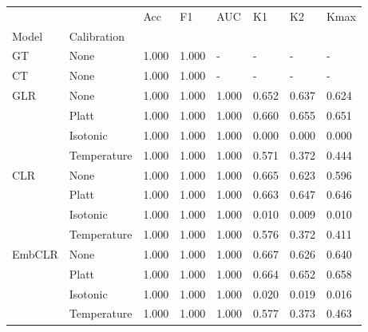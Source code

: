 \begin{tabular}{llllllll}
\toprule
 &  & Acc & F1 & AUC & K1 & K2 & Kmax \\
Model & Calibration &  &  &  &  &  &  \\
\midrule
GT & None & 1.000 & 1.000 & - & - & - & - \\
\cline{1-8}
CT & None & 1.000 & 1.000 & - & - & - & - \\
\cline{1-8}
\multirow[t]{4}{*}{GLR} & None & 1.000 & 1.000 & 1.000 & 0.652 & 0.637 & 0.624 \\
 & Platt & 1.000 & 1.000 & 1.000 & 0.660 & 0.655 & 0.651 \\
 & Isotonic & 1.000 & 1.000 & 1.000 & 0.000 & 0.000 & 0.000 \\
 & Temperature & 1.000 & 1.000 & 1.000 & 0.571 & 0.372 & 0.444 \\
\cline{1-8}
\multirow[t]{4}{*}{CLR} & None & 1.000 & 1.000 & 1.000 & 0.665 & 0.623 & 0.596 \\
 & Platt & 1.000 & 1.000 & 1.000 & 0.663 & 0.647 & 0.646 \\
 & Isotonic & 1.000 & 1.000 & 1.000 & 0.010 & 0.009 & 0.010 \\
 & Temperature & 1.000 & 1.000 & 1.000 & 0.576 & 0.372 & 0.411 \\
\cline{1-8}
\multirow[t]{4}{*}{EmbCLR} & None & 1.000 & 1.000 & 1.000 & 0.667 & 0.626 & 0.640 \\
 & Platt & 1.000 & 1.000 & 1.000 & 0.664 & 0.652 & 0.658 \\
 & Isotonic & 1.000 & 1.000 & 1.000 & 0.020 & 0.019 & 0.016 \\
 & Temperature & 1.000 & 1.000 & 1.000 & 0.577 & 0.373 & 0.463 \\
\cline{1-8}
\bottomrule
\end{tabular}
